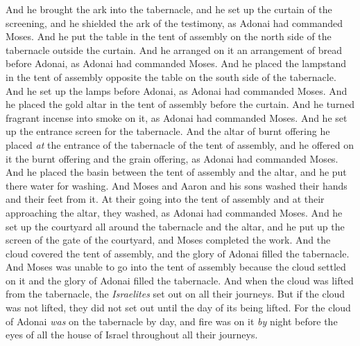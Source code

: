 \begin{biblechapter}
\verse And he brought the ark into the tabernacle, and he set up the curtain of the screening, and he shielded the ark of the testimony, as Adonai had commanded Moses.
\verse And he put the table in the tent of assembly on the north side of the tabernacle outside the curtain.
\verse And he arranged on it an arrangement of bread before Adonai, as Adonai had commanded Moses.
\verse And he placed the lampstand in the tent of assembly opposite the table on the south side of the tabernacle.
\verse And he set up the lamps before Adonai, as Adonai had commanded Moses.
\verse And he placed the gold altar in the tent of assembly before the curtain.
\verse And he turned fragrant incense into smoke on it, as Adonai had commanded Moses.
\verse And he set up the entrance screen for the tabernacle.
\verse And the altar of burnt offering he placed \textit{at} the entrance of the tabernacle of the tent of assembly, and he offered on it the burnt offering and the grain offering, as Adonai had commanded Moses.
\verse And he placed the basin between the tent of assembly and the altar, and he put there water for washing.
\verse And Moses and Aaron and his sons washed their hands and their feet from it.
\verse At their going into the tent of assembly and at their approaching the altar, they washed, as Adonai had commanded Moses.
\verse And he set up the courtyard all around the tabernacle and the altar, and he put up the screen of the gate of the courtyard, and Moses completed the work.
\verse And the cloud covered the tent of assembly, and the glory of Adonai filled the tabernacle.
\verse And Moses was unable to go into the tent of assembly because the cloud settled on it and the glory of Adonai filled the tabernacle.
\verse And when the cloud was lifted from the tabernacle, the \textit{Israelites} set out on all their journeys.
\verse But if the cloud was not lifted, they did not set out until the day of its being lifted.
\verse For the cloud of Adonai \textit{was} on the tabernacle by day, and fire was on it \textit{by} night before the eyes of all the house of Israel throughout all their journeys.
\end{biblechapter}

